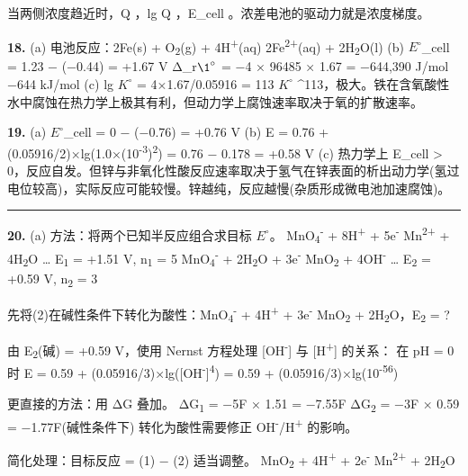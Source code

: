 当两侧浓度趋近时，Q ，lg Q ，E\_cell 。浓差电池的驱动力就是浓度梯度。

\textbf{18.}
(a) 电池反应：2Fe(s) + O\textsubscript{2}(g) + 4H\textsuperscript{+}(aq) \箭 2Fe\textsuperscript{2+}(aq) + 2H\textsubscript{2}O(l)
(b) \(E^{\circ}\)\_cell = 1.23 − (−0.44) = +1.67 V
Δ\_r\(\1^{\circ}\) = −4 × 96485 × 1.67 = −644,390 J/mol  −644 kJ/mol
(c) lg \(K^{\circ}\) = 4×1.67/0.05916 = 113 \箭 \(K^{\circ}\) \^{}113，极大。铁在含氧酸性水中腐蚀在热力学上极其有利，但动力学上腐蚀速率取决于氧的扩散速率。

\textbf{19.}
(a) \(E^{\circ}\)\_cell = 0 − (−0.76) = +0.76 V
(b) E = 0.76 + (0.05916/2)×lg(1.0×(10\textsuperscript{-3})\textsuperscript{2}) = 0.76 − 0.178 = +0.58 V
(c) 热力学上 E\_cell \textgreater{} 0，反应自发。但锌与非氧化性酸反应速率取决于氢气在锌表面的析出动力学(氢过电位较高)，实际反应可能较慢。锌越纯，反应越慢(杂质形成微电池加速腐蚀)。

\begin{center}\rule{0.5\linewidth}{0.5pt}\end{center}

\textbf{20.}
(a) 方法：将两个已知半反应组合求目标 \(E^{\circ}\)。
MnO\textsubscript{4}\textsuperscript{-} + 8H\textsuperscript{+} + 5e\textsuperscript{-} \箭 Mn\textsuperscript{2+} + 4H\textsubscript{2}O \ldots{} E\textsubscript{1} = +1.51 V, n\textsubscript{1} = 5
MnO\textsubscript{4}\textsuperscript{-} + 2H\textsubscript{2}O + 3e\textsuperscript{-} \箭 MnO\textsubscript{2} + 4OH\textsuperscript{-} \ldots{} E\textsubscript{2} = +0.59 V, n\textsubscript{2} = 3

先将(2)在碱性条件下转化为酸性：MnO\textsubscript{4}\textsuperscript{-} + 4H\textsuperscript{+} + 3e\textsuperscript{-} \箭 MnO\textsubscript{2} + 2H\textsubscript{2}O，E\textsubscript{2} = ?

由 E\textsubscript{2}(碱) = +0.59 V，使用 Nernst 方程处理 {[}OH\textsuperscript{-}{]} 与 {[}H\textsuperscript{+}{]} 的关系：
在 pH = 0 时 E = 0.59 + (0.05916/3)×lg({[}OH\textsuperscript{-}{]}\textsuperscript{4}) = 0.59 + (0.05916/3)×lg(10\textsuperscript{-56})

更直接的方法：用 ΔG 叠加。
ΔG\textsubscript{1} = −5F × 1.51 = −7.55F
ΔG\textsubscript{2} = −3F × 0.59 = −1.77F(碱性条件下)
转化为酸性需要修正 OH\textsuperscript{-}/H\textsuperscript{+} 的影响。

简化处理：目标反应 = (1) − (2) 适当调整。
MnO\textsubscript{2} + 4H\textsuperscript{+} + 2e\textsuperscript{-} \箭 Mn\textsuperscript{2+} + 2H\textsubscript{2}O

